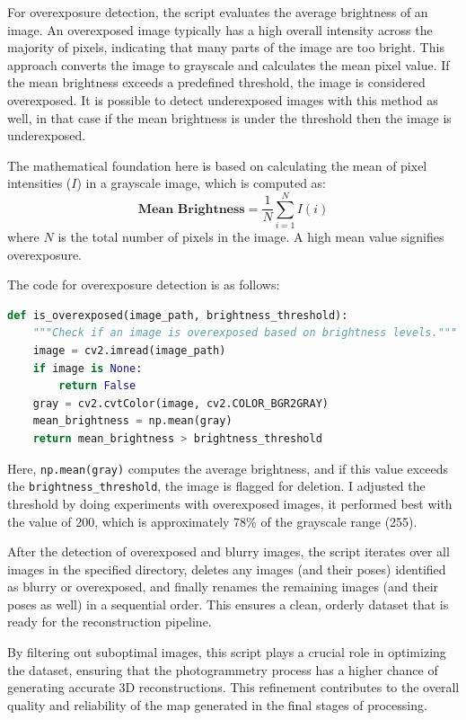 For overexposure detection, the script evaluates the average brightness of an image. An overexposed image typically has a high overall intensity across the majority of pixels, indicating that many parts of the image are too bright. This approach converts the image to grayscale and calculates the mean pixel value. If the mean brightness exceeds a predefined threshold, the image is considered overexposed. It is possible to detect underexposed images with this method as well, in that case if the mean brightness is under the threshold then the image is underexposed.

The mathematical foundation here is based on calculating the mean of pixel intensities (\(I\)) in a grayscale image, which is computed as:
\begin{equation}
    \textbf{Mean Brightness} = \frac{1}{N}\sum_{i=1}^{N} I\left ( i \right )
\end{equation}
where \(N\) is the total number of pixels in the image. A high mean value signifies overexposure.

The code for overexposure detection is as follows:

\FloatBarrier
\begin{lstlisting}[language=python,frame=single,float=!ht]
def is_overexposed(image_path, brightness_threshold):
    """Check if an image is overexposed based on brightness levels."""
    image = cv2.imread(image_path)
    if image is None:
        return False
    gray = cv2.cvtColor(image, cv2.COLOR_BGR2GRAY)
    mean_brightness = np.mean(gray)
    return mean_brightness > brightness_threshold
\end{lstlisting}
\FloatBarrier
Here, \verb|np.mean(gray)| computes the average brightness, and if this value exceeds the \verb|brightness_threshold|, the image is flagged for deletion. I adjusted the threshold by doing experiments with overexposed images, it performed best with the value of 200, which is approximately 78\% of the grayscale range (255).

After the detection of overexposed and blurry images, the script iterates over all images in the specified directory, deletes any images (and their poses) identified as blurry or overexposed, and finally renames the remaining images (and their poses as well) in a sequential order. This ensures a clean, orderly dataset that is ready for the reconstruction pipeline.

By filtering out suboptimal images, this script plays a crucial role in optimizing the dataset, ensuring that the photogrammetry process has a higher chance of generating accurate 3D reconstructions. This refinement contributes to the overall quality and reliability of the map generated in the final stages of processing.

